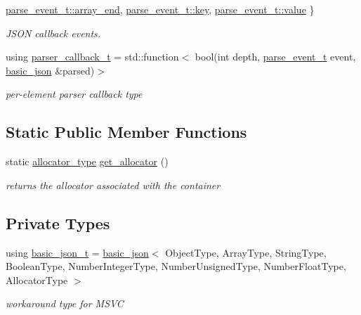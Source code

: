 \begin{DoxyCompactItemize}
\hyperlink{classnlohmann_1_1basic__json_aea1c863b719b4ca5b77188c171bbfafea49642fb732aa2e112188fba1f9d3ef7f}{parse\+\_\+event\+\_\+t\+::array\+\_\+end}, 
\newline
\hyperlink{classnlohmann_1_1basic__json_aea1c863b719b4ca5b77188c171bbfafea3c6e0b8a9c15224a8228b9a98ca1531d}{parse\+\_\+event\+\_\+t\+::key}, 
\hyperlink{classnlohmann_1_1basic__json_aea1c863b719b4ca5b77188c171bbfafea2063c1608d6e0baf80249c42e2be5804}{parse\+\_\+event\+\_\+t\+::value}
 \}\begin{DoxyCompactList}\small\item\em J\+S\+ON callback events. \end{DoxyCompactList}
\item 
using \hyperlink{classnlohmann_1_1basic__json_a9e35475e2027520a78e09f460dbe048a}{parser\+\_\+callback\+\_\+t} = std\+::function$<$ bool(int depth, \hyperlink{classnlohmann_1_1basic__json_aea1c863b719b4ca5b77188c171bbfafe}{parse\+\_\+event\+\_\+t} event, \hyperlink{classnlohmann_1_1basic__json}{basic\+\_\+json} \&parsed)$>$
\begin{DoxyCompactList}\small\item\em per-\/element parser callback type \end{DoxyCompactList}\end{DoxyCompactItemize}
\subsection*{Static Public Member Functions}
\begin{DoxyCompactItemize}
\item 
\hypertarget{classnlohmann_1_1basic__json_a1a446a48beed4ea564addfd12d235793}{}\label{classnlohmann_1_1basic__json_a1a446a48beed4ea564addfd12d235793} 
static \hyperlink{classnlohmann_1_1basic__json_aa44ce84b9ac506b905b8fb56c9a0989d}{allocator\+\_\+type} \hyperlink{classnlohmann_1_1basic__json_a1a446a48beed4ea564addfd12d235793}{get\+\_\+allocator} ()
\begin{DoxyCompactList}\small\item\em returns the allocator associated with the container \end{DoxyCompactList}\end{DoxyCompactItemize}
\subsection*{Private Types}
\begin{DoxyCompactItemize}
\item 
\hypertarget{classnlohmann_1_1basic__json_a3e59ba94923629542aa2a914f0bc2eec}{}\label{classnlohmann_1_1basic__json_a3e59ba94923629542aa2a914f0bc2eec} 
using \hyperlink{classnlohmann_1_1basic__json_a3e59ba94923629542aa2a914f0bc2eec}{basic\+\_\+json\+\_\+t} = \hyperlink{classnlohmann_1_1basic__json}{basic\+\_\+json}$<$ Object\+Type, Array\+Type, String\+Type, Boolean\+Type, Number\+Integer\+Type, Number\+Unsigned\+Type, Number\+Float\+Type, Allocator\+Type $>$
\begin{DoxyCompactList}\small\item\em workaround type for M\+S\+VC \end{DoxyCompactList}\end{DoxyCompactItemize}
